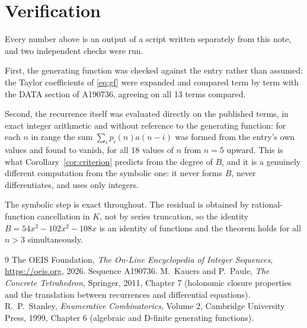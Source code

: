 \documentclass[11pt,a4paper]{article}
\theoremstyle{plain}
\theoremstyle{definition}
\begin{document}
\section{Verification}

Every number above is an output of a script written separately from this note, and two
independent checks were run.

First, the generating function was checked against the entry rather than assumed: the
Taylor coefficients of \eqref{eq:gf} were expanded and compared term by term with the DATA
section of A190736, agreeing on all 13 terms compared.

Second, the recurrence itself was evaluated directly on the published terms, in exact
integer arithmetic and without reference to the generating function: for each $n$ in range
the sum $\sum_{i}p_{i}(n)a(n-i)$ was formed from the entry's own values and found to
vanish, for all 18 values of $n$ from $n=5$ upward. This is what
Corollary~\ref{cor:criterion} predicts from the degree of $B$, and it is a genuinely
different computation from the symbolic one: it never forms $B$, never differentiates, and
uses only integers.

The symbolic step is exact throughout. The residual is obtained by rational-function
cancellation in $K$, not by series truncation, so the identity $B=54 x^{3} - 102 x^{2} - 108 x$ is an
identity of functions and the theorem holds for all $n>3$ simultaneously.

\begin{thebibliography}{9}
 The OEIS Foundation, \emph{The On-Line Encyclopedia of Integer Sequences},
\url{https://oeis.org}, 2026. Sequence A190736.
 M.~Kauers and P.~Paule, \emph{The Concrete Tetrahedron}, Springer, 2011,
Chapter 7 (holonomic closure properties and the translation between recurrences and
differential equations).
 R.~P.~Stanley, \emph{Enumerative Combinatorics}, Volume 2, Cambridge
University Press, 1999, Chapter 6 (algebraic and D-finite generating functions).
\end{thebibliography}
\end{document}
